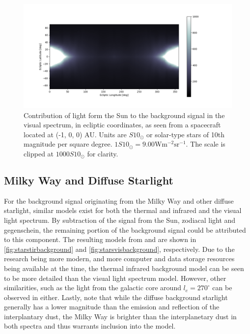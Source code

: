 \begin{figure}[htbp]
 \centering
 \includegraphics[width=1.0\textwidth]{img/background_vis_zodiac.png}
 \caption{Contribution of light form the Sun to the background signal in the visual spectrum, in ecliptic coordinates, as seen from a spacecraft located at (-1, 0, 0) AU. Units are $S10_\odot$ or solar-type stars of 10th magnitude per square degree. $1S10_\odot = 9.00\mathrm{W}\mathrm{m}^{-2}\mathrm{sr}^{-1}$. The scale is clipped at $1000 S10_\odot$ for clarity.}
 \label{fig:solarvisbackground}
\end{figure}


\subsection{Milky Way and Diffuse Starlight}

For the background signal originating from the Milky Way and other diffuse starlight, similar models exist for both the thermal and infrared and the visual light spectrum. By subtraction of the signal from the Sun, zodiacal light and gegenschein, the remaining portion of the background signal could be attributed to this component. The resulting models from \cite{IRDust} and \cite{LightOfTheNightSky} are shown in \autoref{fig:starstirbackground} and \autoref{fig:starsvisbackground}, respectively. Due to the research being more modern, and more computer and data storage resources being available at the time, the thermal infrared background model can be seen to be more detailed than the visual light spectrum model. However, other similarities, such as the light from the galactic core around $l_e = 270^\circ$ can be observed in either. Lastly, note that while the diffuse background starlight generally has a lower magnitude than the emission and reflection of the interplantary dust, the Milky Way is brighter than the interplanetary dust in both spectra and thus warrants inclusion into the model. \\

